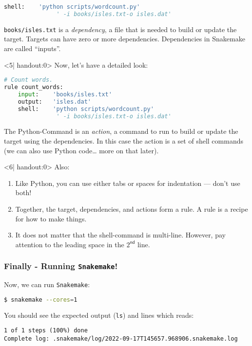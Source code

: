 \begin{frame}[fragile]
\begin{onlyenv}
\begin{lstlisting}[language=Python,style=Python]
    shell:    'python scripts/wordcount.py' 
               ' -i books/isles.txt-o isles.dat'
    \end{lstlisting}
    \texttt{books/isles.txt} is a \emph{dependency}, a file that is needed to build or update the target. Targets can have zero or more dependencies. Dependencies in Snakemake are called “inputs”.
  \end{onlyenv}
  \begin{onlyenv}<5| handout:0>
   Now, let's have a detailed look:
   \begin{lstlisting}[language=Python,style=Python]
# Count words.
rule count_words:
    input:    'books/isles.txt'
    output:   'isles.dat'
    shell:    'python scripts/wordcount.py' 
               ' -i books/isles.txt-o isles.dat'
    \end{lstlisting}
    The Python-Command is an \emph{action}, a command to run to build or update the target using the dependencies. In this case the action is a set of shell commands (we can also use Python code… more on that later).
  \end{onlyenv}
  \begin{onlyenv}<6| handout:0>
  Also:
  \begin{enumerate}
   \item Like Python, you can use either tabs or spaces for indentation — don’t use both!
   \item Together, the target, dependencies, and actions form a rule. A rule is a recipe for how to make things.
   \item It does not matter that the shell-command is multi-line. However, pay attention to the leading space in the $2^\mathsf{nd}$ line.
  \end{enumerate}
  \end{onlyenv}
\end{frame}

\begin{frame}[fragile]
  \frametitle{Finally - Running \texttt{Snakemake}!}
  Now, we can run \texttt{Snakemake}:
  \begin{lstlisting}[language=Bash, style=Shell]
$ snakemake --cores=1
  \end{lstlisting}
  You should see the expected output (\texttt{ls}) and lines which reads:
  \begin{lstlisting}[style=Plain, basicstyle=\footnotesize]
1 of 1 steps (100%) done
Complete log: .snakemake/log/2022-09-17T145657.968906.snakemake.log
  \end{lstlisting}
\end{frame}


